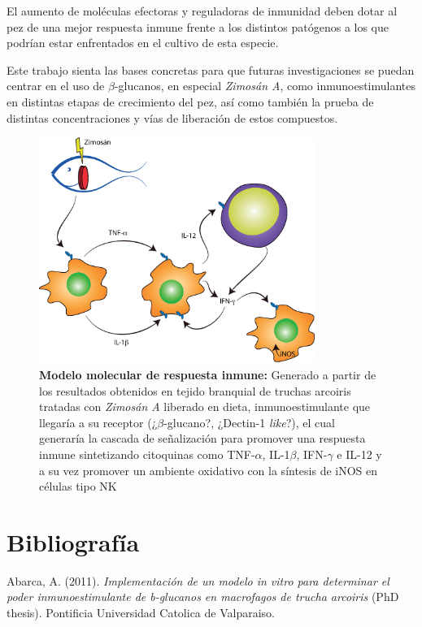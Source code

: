 \documentclass[12pt,letterpaper,oneside]{scrbook}
\begin{document}
El aumento de moléculas efectoras y reguladoras de inmunidad deben dotar
al pez de una mejor respuesta inmune frente a los distintos patógenos a
los que podrían estar enfrentados en el cultivo de esta especie.

Este trabajo sienta las bases concretas para que futuras investigaciones
se puedan centrar en el uso de \(\beta\)-glucanos, en especial
\emph{Zimosán A}, como inmunoestimulantes en distintas etapas de
crecimiento del pez, así como también la prueba de distintas
concentraciones y vías de liberación de estos compuestos.

\begin{figure}[h!]
\centering
    \includegraphics[width=0.8\textwidth]{modelo}
    \caption[Modelo molecular de respuesta inmune]{\textbf{Modelo molecular de respuesta inmune:} Generado a partir de los resultados obtenidos en tejido branquial de truchas arcoiris tratadas con \emph{Zimosán A} liberado en dieta, inmunoestimulante que llegaría a su receptor (¿$\beta$-glucano?, ¿Dectin-1 \emph{like}?), el cual generaría la cascada de señalización para promover una respuesta inmune sintetizando citoquinas como TNF-$\alpha$, IL-1$\beta$, IFN-$\gamma$ e IL-12 y a su vez promover un ambiente oxidativo con la síntesis de iNOS en células tipo NK}
    \label{fig:modelo}
\end{figure}

\chapter{Bibliografía}

Abarca, A. (2011). \emph{Implementación de un modelo in vitro para
determinar el poder inmunoestimulante de b-glucanos en macrofagos de
trucha arcoiris} (PhD thesis). Pontificia Universidad Catolica de
Valparaiso.
\end{document}
